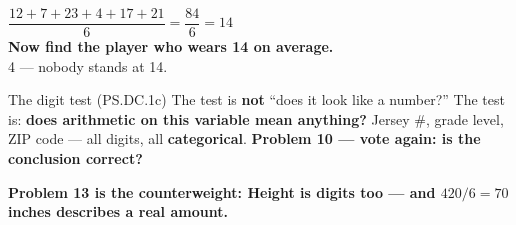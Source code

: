 \documentclass[aspectratio=169, 11pt]{beamer}
\newcommand{\redink}[1]{{\color{redacc}\bfseries #1}}
\begin{document}
\begin{frame}[t, plain]
  \vspace{4pt}
  \begin{center}
    {\large $\dfrac{12+7+23+4+17+21}{6} = \dfrac{84}{6} = 14$}\\[8pt]
    {\Large\bfseries\color{redacc} Now find the player who wears 14 on average.}\\[6pt]
    {\small\color{slate} 4      \qquad --- nobody
    stands at 14.}
  \end{center}
  \vspace{8pt}
  \begin{block}{The digit test (PS.DC.1c)}
    The test is \textbf{not} ``does it look like a number?'' The test is:
    \redink{does arithmetic on this variable mean anything?}
    Jersey \#, grade level, ZIP code --- all digits, all \textbf{categorical}.
    \textbf{Problem 10 --- vote again: is the conclusion correct?}
  \end{block}
  \vspace{4pt}
  \begin{center}
    {\small\color{cerulean}\bfseries Problem 13 is the counterweight: Height is digits too
    --- and $420/6 = 70$ inches describes a real amount.}
  \end{center}
\end{frame}
\end{document}

